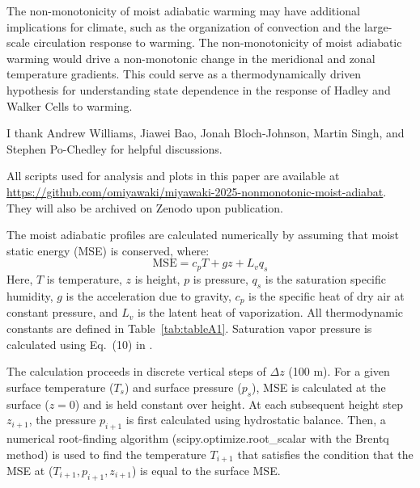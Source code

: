 \documentclass{ametsocV6.1}
\begin{document}
The non-monotonicity of moist adiabatic warming may have additional implications for climate, such as the organization of convection and the large-scale circulation response to warming. The non-monotonicity of moist adiabatic warming would drive a non-monotonic change in the meridional and zonal temperature gradients. This could serve as a thermodynamically driven hypothesis for understanding state dependence in the response of Hadley and Walker Cells to warming.

\acknowledgments
I thank Andrew Williams, Jiawei Bao, Jonah Bloch-Johnson, Martin Singh, and Stephen Po-Chedley for helpful discussions.

% 
%
\datastatement
All scripts used for analysis and plots in this paper are available at \url{https://github.com/omiyawaki/miyawaki-2025-nonmonotonic-moist-adiabat}. They will also be archived on Zenodo upon publication.



\appendix[A] 


The moist adiabatic profiles are calculated numerically by assuming that moist static energy (MSE) is conserved, where:
\begin{equation}
\text{MSE}=c_p T+gz+L_v q_s \label{eq:mse_appendix}
\end{equation}
Here, $T$ is temperature, $z$ is height, $p$ is pressure, $q_s$ is the saturation specific humidity, $g$ is the acceleration due to gravity, $c_p$ is the specific heat of dry air at constant pressure, and $L_v$ is the latent heat of vaporization. All thermodynamic constants are defined in Table~\ref{tab:tableA1}. Saturation vapor pressure is calculated using Eq.~(10) in \cite{bolton1980}.

The calculation proceeds in discrete vertical steps of $\Delta z$ (100 m). For a given surface temperature ($T_s$) and surface pressure ($p_s$), MSE is calculated at the surface ($z=0$) and is held constant over height. At each subsequent height step $z_{i+1}$, the pressure $p_{i+1}$ is first calculated using hydrostatic balance. Then, a numerical root-finding algorithm (scipy.optimize.root\_scalar with the Brentq method) is used to find the temperature $T_{i+1}$ that satisfies the condition that the MSE at ($T_{i+1}, p_{i+1}, z_{i+1}$) is equal to the surface MSE.
\end{document}
